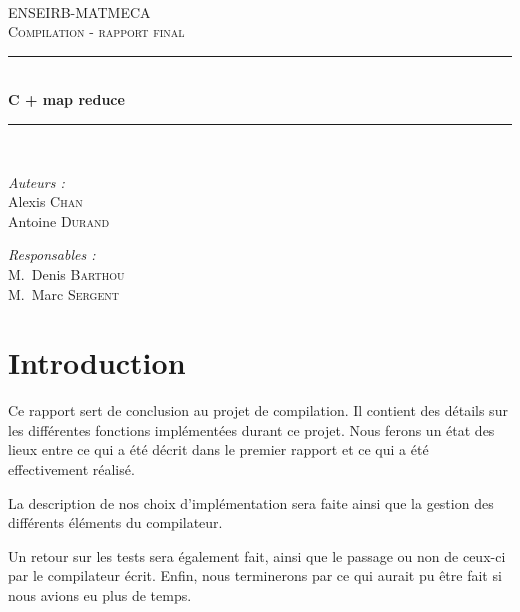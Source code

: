 \documentclass[a4paper,12pt]{article}
\begin{document}
\begin{titlepage}


\begin{center}

~\\[3.0cm]

\textsc{\LARGE ENSEIRB-MATMECA}\\[1.5cm]

\textsc{\Large  Compilation - rapport final}\\[1.5cm]

\hrule ~\\[0.4cm]
{\huge \bfseries  C + map reduce}\\[0.4cm]
\hrule ~\\[1.5cm]

\begin{minipage}[t]{0.4\textwidth}
  \begin{flushleft} \large
    \emph{Auteurs :}\\
    Alexis \textsc{Chan}\\
    Antoine \textsc{Durand}
  \end{flushleft}
\end{minipage}
\begin{minipage}[t]{0.5\textwidth}
  \begin{flushright} \large
    \emph{Responsables :} \\
    M.~Denis \textsc{Barthou} \\
    M.~Marc \textsc{Sergent}\\

  \end{flushright}
\end{minipage}

\end{center}

\end{titlepage}

\newpage
\section*{Introduction}
Ce rapport sert de conclusion au projet de compilation. Il contient des détails sur les différentes fonctions implémentées durant ce projet. Nous ferons un état des lieux entre ce qui a été décrit dans le premier rapport et ce qui a été effectivement réalisé. 

La description de nos choix d'implémentation sera faite ainsi que la gestion des différents éléments du compilateur. 

Un retour sur les tests sera également fait, ainsi que le passage ou non de ceux-ci par le compilateur écrit. 
Enfin, nous terminerons par ce qui aurait pu être fait si nous avions eu plus de temps. 
\end{document}
